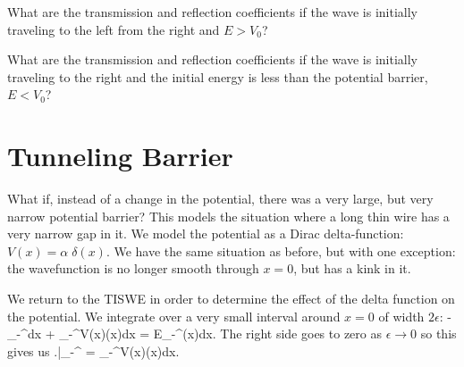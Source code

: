 \begin{exercise}
What are the transmission and reflection coefficients if the wave is initially traveling to the left from the right and $E>V_0$?
\end{exercise}

\begin{exercise}
What are the transmission and reflection coefficients if the wave is initially traveling to the right and the initial energy is less than the potential barrier, $E<V_0$?
\end{exercise}

\section{Tunneling Barrier}
\label{tunnelingdelta}
What if, instead of a change in the potential, there was a very large, but very narrow potential barrier? This models the situation where a long thin wire has a very narrow gap in it. We model the potential as a Dirac delta-function: $V(x) = \alpha\;\delta(x)$. We have the same situation as before, but with one exception: the wavefunction is no longer smooth through $x=0$, but has a kink in it.
\begin{marginfigure}
\centering
{}
\end{marginfigure}%
We return to the TISWE in order to determine the effect of the delta function on the potential. We integrate over a very small interval around $x=0$ of width $2\epsilon$:
\beq
-\int\displaylimits_{-\epsilon}^{\epsilon}dx + \int\displaylimits_{-\epsilon}^{\epsilon}V(x)\psi(x)dx = E\int\displaylimits_{-\epsilon}^{\epsilon}\psi(x)dx.
\eeq\marginnote{\ref{tool:TISWE}}
The right side goes to zero as $\epsilon\rightarrow0$ so this gives us
\beq
\left.\right|_{-\epsilon}^{\epsilon} = \int\displaylimits_{-\epsilon}^{\epsilon}V(x)\psi(x)dx.
\eeq{}
